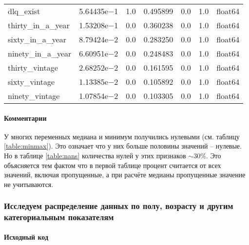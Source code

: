 \documentclass[12pt,a4paper]{article}
\begin{document}
\begin{longtable}{l|rrrrr|l}
    dlq\_exist               & 5.64435e$-$1 & 1.0      & 0.495899 & 0.0     & 1.0     & float64 \\
    thirty\_in\_a\_year      & 1.53208e$-$1 & 0.0      & 0.360238 & 0.0     & 1.0     & float64 \\
    sixty\_in\_a\_year       & 8.79424e$-$2 & 0.0      & 0.283250 & 0.0     & 1.0     & float64 \\
    ninety\_in\_a\_year      & 6.60951e$-$2 & 0.0      & 0.248483 & 0.0     & 1.0     & float64 \\
    thirty\_vintage          & 2.68252e$-$2 & 0.0      & 0.161595 & 0.0     & 1.0     & float64 \\
    sixty\_vintage           & 1.13385e$-$2 & 0.0      & 0.105892 & 0.0     & 1.0     & float64 \\
    ninety\_vintage          & 1.07854e$-$2 & 0.0      & 0.103305 & 0.0     & 1.0     & float64 \\
  \end{longtable}

  \paragraph*{Комментарии}
  У многих переменных медиана и минимум получились нулевыми (см. таблицу \ref{table:minmax}).
  Это означает что у них больше половины значений -- нулевые.
  Но в таблице \ref{table:nans} количества нулей у этих признаков $\sim 30\%$.
  Это объясняется тем фактом что в первой таблице процент считается от всех значений, включая пропущенные,
  а при расчёте медианы пропущенные значение не учитываются.

  \subsubsection{Исследуем распределение данных по полу, возрасту и другим категориальным показателям}
  \paragraph*{Исходный код}
\begin{Shaded}
\begin{Highlighting}[]
\OperatorTok{=}\NormalTok{, }\OperatorTok{=}\NormalTok{(}\NormalTok{, }\NormalTok{))}
\OperatorTok{=}\NormalTok{)}
\NormalTok{)}
 
\OperatorTok{=}\NormalTok{)}
\OperatorTok{=}

\end{Highlighting}
\end{Shaded}
\end{document}
